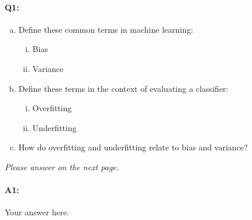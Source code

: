 \paragraph{Q1:} 

\begin{enumerate} [(a)]
    \item Define these common terms in machine learning:
    \begin{enumerate} [(i)]
    \item Bias
    \item Variance
    \end{enumerate}
    \item Define these terms in the context of evaluating a classifier:
    \begin{enumerate} [(i)]
    \item Overfitting
    \item Underfitting
    \end{enumerate}
    \item How do overfitting and underfitting relate to bias and variance?
\end{enumerate}

\emph{Please answer on the next page.}

\pagebreak
\paragraph{A1:} Your answer here.







